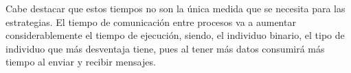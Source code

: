 Cabe destacar que estos tiempos no son la única medida que se necesita para las estrategias. El tiempo de comunicación entre procesos va a aumentar considerablemente el tiempo de ejecución, siendo, el individuo binario, el tipo de individuo que más desventaja tiene, pues al tener más datos consumirá más tiempo al enviar y recibir mensajes.





